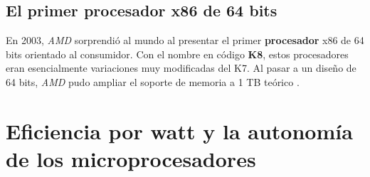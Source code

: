 \subsection{El primer \textbf{procesador} x86 de 64 bits}
En 2003, \emph{AMD} sorprendió al mundo al presentar el primer \textbf{procesador} x86 de 64 bits orientado al consumidor. Con el nombre en código \textbf{K8}, estos procesadores eran
esencialmente variaciones muy modificadas del K7. Al pasar a un diseño de 64 bits, \emph{AMD} pudo ampliar el soporte de memoria a 1 TB teórico .

\section{Eficiencia por watt y la autonomía de los microprocesadores}
